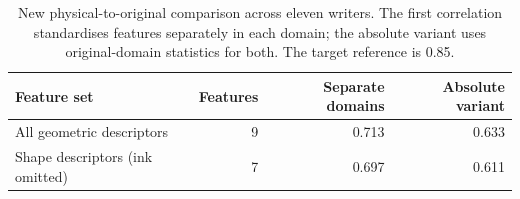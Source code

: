 \begin{table}[!htbp]\centering\small
\begin{tabular}{lrrr}\toprule
\textbf{Feature set} & \textbf{Features} & \textbf{Separate domains} & \textbf{Absolute variant}\\\midrule
All geometric descriptors & 9 & 0.713 & 0.633\\
Shape descriptors (ink omitted) & 7 & 0.697 & 0.611\\
\bottomrule\end{tabular}
\caption{New physical-to-original comparison across eleven writers. The first correlation standardises features separately in each domain; the absolute variant uses original-domain statistics for both. The target reference is 0.85.}\label{tab:res-physical-style}
\end{table}
